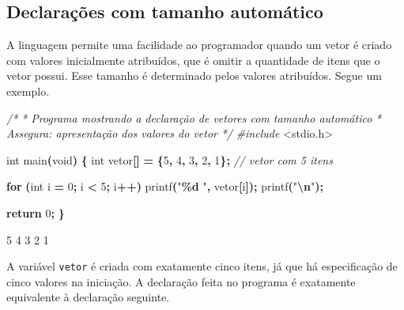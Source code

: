\documentclass[
  11pt,
  a4paper,
]{scrbook}
\newenvironment{Shaded}{\begin{snugshade}}{\end{snugshade}}
\newcommand{\CommentTok}[1]{\textcolor[rgb]{0.56,0.35,0.01}{\textit{#1}}}
\newcommand{\ControlFlowTok}[1]{\textcolor[rgb]{0.13,0.29,0.53}{\textbf{#1}}}
\newcommand{\DataTypeTok}[1]{\textcolor[rgb]{0.13,0.29,0.53}{#1}}
\newcommand{\DecValTok}[1]{\textcolor[rgb]{0.00,0.00,0.81}{#1}}
\newcommand{\ImportTok}[1]{#1}
\newcommand{\NormalTok}[1]{#1}
\newcommand{\OperatorTok}[1]{\textcolor[rgb]{0.81,0.36,0.00}{\textbf{#1}}}
\newcommand{\PreprocessorTok}[1]{\textcolor[rgb]{0.56,0.35,0.01}{\textit{#1}}}
\newcommand{\SpecialCharTok}[1]{\textcolor[rgb]{0.81,0.36,0.00}{\textbf{#1}}}
\newcommand{\StringTok}[1]{\textcolor[rgb]{0.31,0.60,0.02}{#1}}
\begin{document}
\subsection{Declarações com tamanho
automático}\label{declarauxe7uxf5es-com-tamanho-automuxe1tico}

A linguagem permite uma facilidade ao programador quando um vetor é
criado com valores inicialmente atribuídos, que é omitir a quantidade de
itens que o vetor possui. Esse tamanho é determinado pelos valores
atribuídos. Segue um exemplo.

\begin{Shaded}
\begin{Highlighting}[]
\CommentTok{/*}
\CommentTok{ * Programa mostrando a declaração de vetores com tamanho automático}
\CommentTok{ * Assegura: apresentação dos valores do vetor}
\CommentTok{ */}
\PreprocessorTok{\#include }\ImportTok{\textless{}stdio.h\textgreater{}}

\DataTypeTok{int}\NormalTok{ main}\OperatorTok{(}\DataTypeTok{void}\OperatorTok{)} \OperatorTok{\{}
    \DataTypeTok{int}\NormalTok{ vetor}\OperatorTok{[]} \OperatorTok{=} \OperatorTok{\{}\DecValTok{5}\OperatorTok{,} \DecValTok{4}\OperatorTok{,} \DecValTok{3}\OperatorTok{,} \DecValTok{2}\OperatorTok{,} \DecValTok{1}\OperatorTok{\};}  \CommentTok{// vetor com 5 itens}

    \ControlFlowTok{for} \OperatorTok{(}\DataTypeTok{int}\NormalTok{ i }\OperatorTok{=} \DecValTok{0}\OperatorTok{;}\NormalTok{ i }\OperatorTok{\textless{}} \DecValTok{5}\OperatorTok{;}\NormalTok{ i}\OperatorTok{++)}
\NormalTok{        printf}\OperatorTok{(}\StringTok{"}\SpecialCharTok{\%d}\StringTok{ "}\OperatorTok{,}\NormalTok{ vetor}\OperatorTok{[}\NormalTok{i}\OperatorTok{]);}
\NormalTok{    printf}\OperatorTok{(}\StringTok{"}\SpecialCharTok{\textbackslash{}n}\StringTok{"}\OperatorTok{);}

    \ControlFlowTok{return} \DecValTok{0}\OperatorTok{;}
\OperatorTok{\}}
\end{Highlighting}
\end{Shaded}

\begin{Shaded}
\begin{Highlighting}[]
\NormalTok{5 4 3 2 1 }
\end{Highlighting}
\end{Shaded}

A variável \texttt{vetor} é criada com exatamente cinco itens, já que há
especificação de cinco valores na iniciação. A declaração feita no
programa é exatamente equivalente à declaração seguinte.
\end{document}
